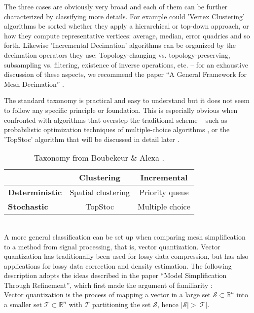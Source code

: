 The three cases are obviously very broad and each of them can be further characterized by classifying more details.
For example could 'Vertex Clustering' algorithms be sorted whether they apply a hierarchical or top-down approach, or how they compute representative vertices: average, median, error quadrics and so forth.
Likewise 'Incremental Decimation' algorithms can be organized by the decimation operators they use: Topology-changing vs. topology-preserving, subsampling vs. filtering, existence of inverse operations, etc. -- for an exhaustive discussion of these aspects, we recommend the paper ``A General Framework for Mesh Decimation'' \citep[cf.][]{Kobbelt1998}.

The standard taxonomy is practical and easy to understand but it does not seem to follow any specific principle or foundation.
This is especially obvious when confronted with algorithms that overstep the traditional scheme -- such as probabilistic optimization techniques of multiple-choice algorithms \citep[cf.][]{Wu2002}, or the 'TopStoc' algorithm that will be discussed in detail later \citep[][cf.]{Boubekeur2009}.
\begin{table}[htpb]
\medskip
\setlength{\tabcolsep}{15pt}
\renewcommand{\arraystretch}{1.5}
   \centering
\begin{tabular}{ l || c | c } \centering
    & \textbf{Clustering} & \textbf{Incremental} \\ \hline \hline
  \textbf{Deterministic} & Spatial clustering & Priority queue \\
  \textbf{Stochastic} & TopStoc & Multiple choice \\
\end{tabular}
   \label{tab:taxonomies} \bigskip
   \caption{Taxonomy from Boubekeur \& Alexa \citep[p.2]{Boubekeur2009}.}
\end{table}\\
A more general classification can be set up when comparing mesh simplification to a method from signal processing, that is, vector quantization.
Vector quantization has traditionally been used for lossy data compression, but has also applications for lossy data correction and density estimation.
The following description adopts the ideas described in the paper ``Model Simplification Through Refinement'', which first made the argument of familiarity \citep[][cf. pp.221-222]{Brodsky2000}:\\
Vector quantization is the process of mapping a vector in a large set $\mathcal{S} \subset \mathbb{R}^{n}$ into a smaller set $\mathcal{T} \subset \mathbb{R}^{n}$ with $\mathcal{T}$ partitioning the set $\mathcal{S}$, hence $|\mathcal{S}| > |\mathcal{T}|$.
